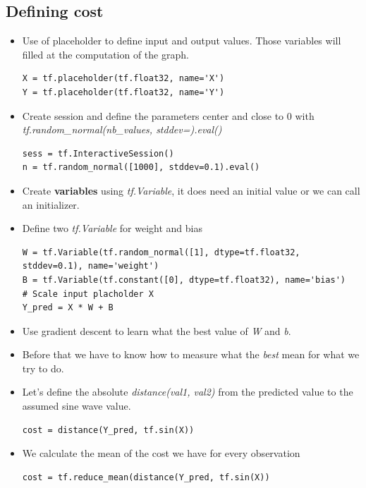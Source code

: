 \documentclass[12pt,a4paper]{article}
\begin{document}
\subsection{Defining cost}
\begin{itemize}
\item Use of placeholder to define input and output values. Those variables will filled at the computation of the graph.
\begin{lstlisting}
X = tf.placeholder(tf.float32, name='X')
Y = tf.placeholder(tf.float32, name='Y')
\end{lstlisting}
\item Create session and define the parameters center and close to 0 with \\
\textit{tf.random\_normal(nb\_values, stddev=).eval()}
\begin{lstlisting}
sess = tf.InteractiveSession()
n = tf.random_normal([1000], stddev=0.1).eval()
\end{lstlisting}
\item Create \textbf{variables} using \textit{tf.Variable}, it does need an initial value or we can call an initializer.
\item Define two \textit{tf.Variable} for weight and bias
\begin{lstlisting}
W = tf.Variable(tf.random_normal([1], dtype=tf.float32, stddev=0.1), name='weight')
B = tf.Variable(tf.constant([0], dtype=tf.float32), name='bias')
# Scale input placholder X
Y_pred = X * W + B
\end{lstlisting}
\item Use gradient descent to learn what the best value of \textit{W} and \textit{b}.
\item Before that we have to know how to measure what the \textit{best} mean for what we try to do.
\item Let's define the absolute \textit{distance(val1, val2)} from the predicted value to the assumed sine wave value.
\begin{lstlisting}
cost = distance(Y_pred, tf.sin(X))
\end{lstlisting}
\item We calculate the mean of the cost we have for every observation
\begin{lstlisting}
cost = tf.reduce_mean(distance(Y_pred, tf.sin(X))
\end{lstlisting}
\end{itemize}
\end{document}
